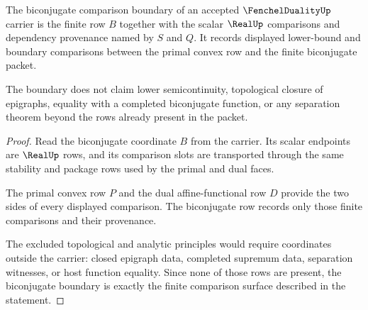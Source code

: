 \begin{theorem}
\label{thm:fenchelduality-biconjugate-boundary}
The biconjugate comparison boundary of an accepted $\FenchelDualityUp$ carrier is the finite row $B$ together with the scalar $\RealUp$ comparisons and dependency provenance named by $S$ and $Q$. It records displayed lower-bound and boundary comparisons between the primal convex row and the finite biconjugate packet.

The boundary does not claim lower semicontinuity, topological closure of epigraphs, equality with a completed biconjugate function, or any separation theorem beyond the rows already present in the packet.
\end{theorem}
\begin{proof}
Read the biconjugate coordinate $B$ from the carrier. Its scalar endpoints are $\RealUp$ rows, and its comparison slots are transported through the same stability and package rows used by the primal and dual faces.

The primal convex row $P$ and the dual affine-functional row $D$ provide the two sides of every displayed comparison. The biconjugate row records only those finite comparisons and their provenance.

The excluded topological and analytic principles would require coordinates outside the carrier: closed epigraph data, completed supremum data, separation witnesses, or host function equality. Since none of those rows are present, the biconjugate boundary is exactly the finite comparison surface described in the statement.
\end{proof}

